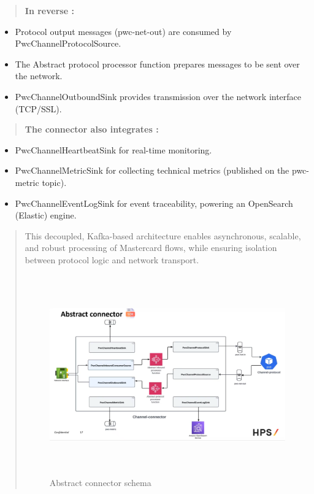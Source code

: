 \documentclass[12pt,a4paper]{report}
\begin{document}
\begin{quote}
\textbf{In reverse :}
\end{quote}

\begin{itemize}
\item
  Protocol output messages (pwc-net-out) are consumed by
  PwcChannelProtocolSource.
\item
  The Abstract protocol processor function prepares messages to be sent
  over the network.
\item
  PwcChannelOutboundSink provides transmission over the network
  interface (TCP/SSL).
\end{itemize}

\begin{quote}
\textbf{The connector also integrates :}
\end{quote}

\begin{itemize}
\item
  PwcChannelHeartbeatSink for real-time monitoring.
\item
  PwcChannelMetricSink for collecting technical metrics (published on
  the pwc-metric topic).
\item
  PwcChannelEventLogSink for event traceability, powering an OpenSearch
  (Elastic) engine.
\end{itemize}

\begin{quote}
This decoupled, Kafka-based architecture enables asynchronous, scalable,
and robust processing of Mastercard flows, while ensuring isolation
between protocol logic and network transport.
\begin{figure}[H]
\centering
\includegraphics[width=6.03815in,height=3.38958in]{media/image51.png}
\caption{Abstract connector schema}
\label{fig:ACC}
\end{figure}

\end{quote}
\end{document}
